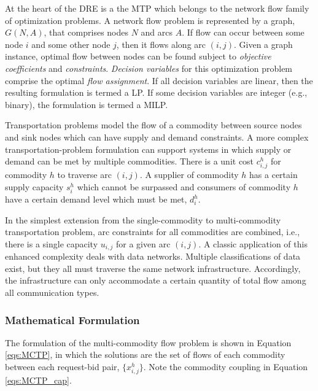 At the heart of the \gls{DRE} is a the \gls{MTP} 
which belongs to the network flow family of optimization problems. A network
flow problem is represented by a graph, $G(N, A)$, that comprises nodes $N$ and
arcs $A$. If flow can occur between some node $i$ and some other node $j$,
then it flows along arc $(i, j)$. Given a graph instance, optimal flow between
nodes can be found subject to \textit{objective coefficients} and
\textit{constraints}. \textit{Decision variables} for this optimization
problem comprise the optimal \textit{flow assignment}. If all decision
variables are linear, then the resulting formulation is termed a \gls{LP}. If
some decision variables are integer (e.g., binary), the formulation is termed
a \gls{MILP}.

Transportation problems model the flow of a commodity between source nodes and
sink nodes which can have supply and demand constraints. A more complex
transportation-problem formulation can support systems in which supply or demand
can be met by multiple commodities.  There is a unit cost $c_{i,j}^{h}$ for
commodity $h$ to traverse arc $(i,j)$. A supplier of commodity $h$ has a certain
supply capacity $s_i^h$ which cannot be surpassed and consumers of commodity $h$
have a certain demand level which must be met, $d_i^h$.

In the simplest extension from the single-commodity to multi-commodity
transportation problem, arc constraints for all commodities are combined,
i.e., there is a single capacity $u_{i,j}$ for a given arc $(i, j)$. A classic
application of this enhanced complexity deals with data networks. Multiple
classifications of data exist, but they all must traverse the same network
infrastructure. Accordingly, the infrastructure can only accommodate a certain
quantity of total flow among all communication types.

\subsubsection{Mathematical Formulation}


The formulation of the multi-commodity flow problem is shown in Equation
\ref{eqs:MCTP}, in which the solutions are the set of flows of each commodity
between each request-bid pair, $\{x_{i,j}^h\}$. Note the commodity
coupling in Equation \ref{eqs:MCTP_cap}.

